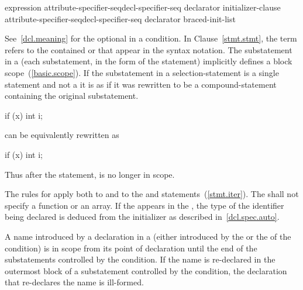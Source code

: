 \begin{bnf}
\br
    expression\br
    attribute-specifier-seq\opt decl-specifier-seq declarator \terminal{=} initializer-clause\br
    attribute-specifier-seq\opt decl-specifier-seq declarator braced-init-list
\end{bnf}

See~\ref{dcl.meaning} for the optional  in a condition.
In Clause~\ref{stmt.stmt}, the term  refers to
the contained  or  that appear
in the syntax notation.
%
The substatement in a  (each substatement,
in the  form of the  statement) implicitly defines
a block scope~(\ref{basic.scope}). If the substatement in a
selection-statement is a single statement and not a
 it is as if it was rewritten to be a
compound-statement containing the original substatement.
\enterexample

\begin{codeblock}
if (x)
  int i;
\end{codeblock}

can be equivalently rewritten as

\begin{codeblock}
if (x) {
  int i;
}
\end{codeblock}

Thus after the  statement,  is no longer in scope.
\exitexample

\pnum
{}%
The rules for  apply both to
 and to the  and 
statements~(\ref{stmt.iter}). The  shall not
specify a function or an array. If the   appears in
the ,
the type of the identifier being declared is deduced from the initializer as described in~\ref{dcl.spec.auto}.

\pnum
{}%
%
A name introduced by a declaration in a  (either
introduced by the  or the
 of the condition) is in scope from its point of
declaration until the end of the substatements controlled by the
condition. If the name is re-declared in the outermost block of a
substatement controlled by the condition, the declaration that
re-declares the name is ill-formed.
\enterexample

